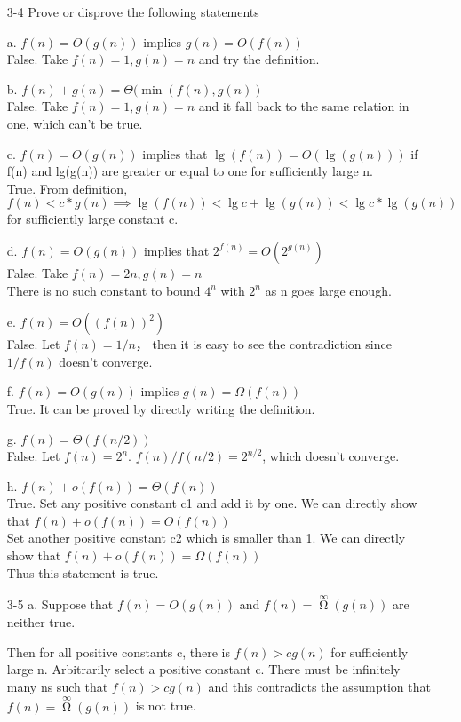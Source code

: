 \documentclass[]{article}
\begin{document}
\begin{enumerate}
\item[3-4] Prove or disprove the following statements

a. $ f(n) = O(g(n)) $ implies $g(n) = O(f(n))$\\
False. Take $ f(n) = 1,g(n) = n $ and try the definition.

b. $ f(n) + g(n) = \Theta(\min(f(n),g(n)) $\\
False. Take $ f(n) = 1,g(n) = n $ and it fall back to the same relation in one, which can't be true.

c. $ f(n) = O(g(n)) $ implies that $ \lg(f(n)) = O(\lg(g(n))) $ if f(n) and lg(g(n)) are greater or equal to one for sufficiently large n.\\
True. From definition,\\
$ f(n) < c*g(n) \implies \lg(f(n)) < \lg c + \lg (g(n)) < \lg c * \lg(g(n)) $ for sufficiently large constant c.

d. $ f(n) = O(g(n)) $ implies that $ 2^{f(n)} = O(2^{g(n)}) $\\
False. Take $f(n) = 2n , g(n) = n $\\
There is no such constant to bound $4^n$ with $ 2^n $ as n goes large enough.

e. $ f(n) = O((f(n))^2) $\\
False. Let $ f(n) = 1/n $， then it is easy to see the contradiction since $ 1/f(n) $ doesn't converge.

f. $ f(n) = O(g(n)) $ implies $ g(n) = \Omega(f(n)) $\\
True. It can be proved by directly writing the definition.

g. $ f(n) = \Theta(f(n/2)) $\\
False. Let $f(n) = 2^n$. $ f(n)/f(n/2) = 2^{n/2} $, which doesn't converge.

h. $ f(n) + o(f(n)) = \Theta(f(n)) $\\
True. Set any positive constant c1 and add it by one. We can directly show that $ f(n) + o(f(n)) = O(f(n)) $\\
Set another positive constant c2 which is smaller than 1. We can directly show that $ f(n) + o(f(n)) = \Omega(f(n)) $\\
Thus this statement is true.

\item[3-5] a. Suppose that $f(n) = O(g(n)) $ and $f(n) = \mathop{\Omega}\limits^{\infty}(g(n)) $ are neither true.

Then for all positive constants c, there is $ f(n) > cg(n) $ for sufficiently large n. Arbitrarily select a positive constant c. There must be infinitely many ns such that $ f(n) > cg(n) $ and this contradicts the assumption that $f(n) = \mathop{\Omega}\limits^{\infty}(g(n)) $ is not true.


\end{enumerate}
\end{document}
